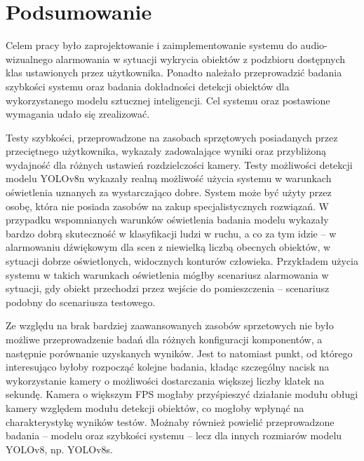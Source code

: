 \chapter{Podsumowanie}
\label{chap:podsumowanie}
Celem pracy było zaprojektowanie i zaimplementowanie systemu do audio-wizualnego alarmowania w sytuacji wykrycia obiektów z podzbioru dostępnych klas ustawionych przez użytkownika. Ponadto należało przeprowadzić badania szybkości systemu oraz badania dokładności detekcji obiektów dla wykorzystanego modelu sztucznej inteligencji.
Cel systemu oraz postawione wymagania udało się zrealizować.


Testy szybkości, przeprowadzone na zasobach sprzętowych posiadanych przez przeciętnego użytkownika, wykazały zadowalające wyniki oraz przybliżoną wydajność dla różnych ustawień rozdzielczości kamery. Testy możliwości detekcji modelu YOLOv8n wykazały realną możliwość użycia systemu w warunkach oświetlenia uznanych za wystarczająco dobre. System może być użyty przez osobę, która nie posiada zasobów na zakup specjalistycznych rozwiązań.
W przypadku wspomnianych warunków oświetlenia badania modelu wykazały bardzo dobrą skuteczność w klasyfikacji ludzi w ruchu, a co za tym idzie -- w alarmowaniu dźwiękowym dla scen z niewielką liczbą obecnych obiektów, w sytuacji dobrze oświetlonych, widocznych konturów człowieka. Przykładem użycia systemu w takich warunkach oświetlenia mógłby scenariusz alarmowania w sytuacji, gdy obiekt przechodzi przez wejście do pomieszczenia -- scenariusz podobny do scenariusza testowego.  


Ze względu na brak bardziej zaawansowanych zasobów sprzetowych nie było możliwe przeprowadzenie badań dla różnych konfiguracji komponentów, a następnie porównanie uzyskanych wyników. Jest to natomiast punkt, od którego interesująco byłoby rozpocząć kolejne badania, kładąc szczególny nacisk na wykorzystanie kamery o możliwości dostarczania większej liczby klatek na sekundę. Kamera o większym FPS mogłaby przyśpieszyć działanie modułu obługi kamery względem modułu detekcji obiektów, co mogłoby wpłynąć na charakterystykę wyników testów. Możnaby również powielić przeprowadzone badania -- modelu oraz szybkości systemu -- lecz dla innych rozmiarów modelu YOLOv8, np. YOLOv8s.  


